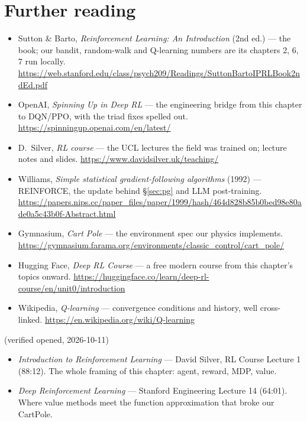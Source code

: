 \section*{Further reading}
\label{sec:further13}
\begin{itemize}
\item Sutton \& Barto, \emph{Reinforcement Learning: An Introduction}
(2nd ed.) --- the book; our bandit, random-walk and Q-learning numbers
are its chapters 2, 6, 7 run locally.
\url{https://web.stanford.edu/class/psych209/Readings/SuttonBartoIPRLBook2ndEd.pdf}
\item OpenAI, \emph{Spinning Up in Deep RL} --- the engineering bridge
from this chapter to DQN/PPO, with the triad fixes spelled out.
\url{https://spinningup.openai.com/en/latest/}
\item D.~Silver, \emph{RL course} --- the UCL lectures the field was
trained on; lecture notes and slides.
\url{https://www.davidsilver.uk/teaching/}
\item Williams, \emph{Simple statistical gradient-following
algorithms} (1992) --- REINFORCE, the update behind \S\ref{sec:pg}
and LLM post-training.
\url{https://papers.nips.cc/paper_files/paper/1999/hash/464d828b85b0bed98e80ade0a5c43b0f-Abstract.html}
\item Gymnasium, \emph{Cart Pole} --- the environment spec our
physics implements.
\url{https://gymnasium.farama.org/environments/classic_control/cart_pole/}
\item Hugging Face, \emph{Deep RL Course} --- a free modern course
from this chapter's topics onward.
\url{https://huggingface.co/learn/deep-rl-course/en/unit0/introduction}
\item Wikipedia, \emph{Q-learning} --- convergence conditions and
history, well cross-linked. \url{https://en.wikipedia.org/wiki/Q-learning}
\end{itemize}

\begin{rulebox}
(verified opened, 2026-10-11)
\begin{itemize}
\item \emph{Introduction to Reinforcement Learning} --- David Silver,
RL Course Lecture 1 (88:12). The whole framing of this chapter:
agent, reward, MDP, value.
\item \emph{Deep Reinforcement Learning} --- Stanford Engineering
Lecture 14 (64:01). Where value methods meet the function
approximation that broke our CartPole.
\end{itemize}
\end{rulebox}


